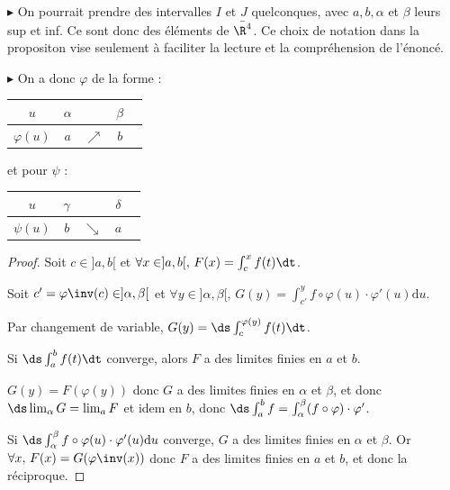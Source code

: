 \begin{remarque}
    $\blacktriangleright$ On pourrait prendre des intervalles $I$ et $J$ quelconques, 
    avec $a, b, \alpha$ et $\beta$ leurs sup et inf. Ce sont donc des éléments de $\bar{\R^4}$.
    Ce choix de notation dans la propositon vise seulement à faciliter la lecture et la compréhension de l'énoncé.

    \avspace $\blacktriangleright$ On a donc $\varphi$ de la forme :  
    \begin{center}
        \begin{tabular}{c|c c c c}
            $u$ & $\alpha$ &  & $\beta$ \\
            \hline
            $\varphi(u)$ & $a$ & $\nearrow$ &$b$ \\
        \end{tabular}
    \end{center}

    et pour $\psi$ :
    \begin{center}
        \begin{tabular}{c|c c c c}
            $u$ & $\gamma$ &  & $\delta$ \\
            \hline
            $\psi(u)$ & $b$ & $\searrow$ &$a$ \\
        \end{tabular}
    \end{center}
\end{remarque}


\begin{proof}
    Soit $c \in ]a, b[$ et $\forall x \in ]a, b[, \, F(x) = \int_c^x f(t) \dt$.

    Soit $c' = \varphi \inv (c) \in ]\alpha, \beta[$ et 
    $\forall y \in ] \alpha, \beta[, \, G(y) = \int_{c'}^y f \circ \varphi(u) \cdot \varphi'(u) \mathrm d u$.

    Par changement de variable, $G(y) = \ds \int_c^{\varphi(y)} f(t) \dt$. 

    Si $\ds \int_{a }^{b } f(t) \dt$ converge, alors $F$ a des limites finies en $a$ et $b$.

    $G(y) = F(\varphi(y))$ donc $G$ a des limites finies en $\alpha$ et $\beta$, et donc 
    $\ds \lim_\alpha G = \lim_a F$ et idem en $b$, donc 
    $\ds \int_{a }^{b } f = \int_\alpha^\beta (f \circ \varphi) \cdot \varphi'$.

    Si $\ds \int_{\alpha }^{\beta } f \circ \varphi(u) \cdot \varphi'(u) \mathrm d u$ converge,
    $G$ a des limites finies en $\alpha$ et $\beta$. Or $\forall x, \, F(x) = G(\varphi \inv (x))$ donc $F$ a des limites finies en $a$ et $b$, et
    donc la réciproque. 
\end{proof}


